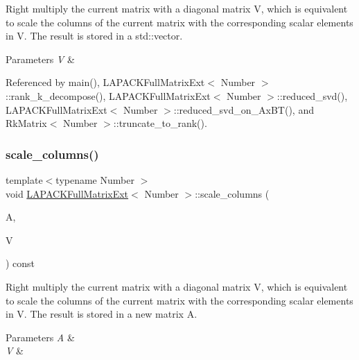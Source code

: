 Right multiply the current matrix with a diagonal matrix {\ttfamily V}, which is equivalent to scale the columns of the current matrix with the corresponding scalar elements in {\ttfamily V}. The result is stored in a {\ttfamily std\+::vector}.


\begin{DoxyParams}{Parameters}
{\em V} & \\
\hline
\end{DoxyParams}


Referenced by main(), L\+A\+P\+A\+C\+K\+Full\+Matrix\+Ext$<$ Number $>$\+::rank\+\_\+k\+\_\+decompose(), L\+A\+P\+A\+C\+K\+Full\+Matrix\+Ext$<$ Number $>$\+::reduced\+\_\+svd(), L\+A\+P\+A\+C\+K\+Full\+Matrix\+Ext$<$ Number $>$\+::reduced\+\_\+svd\+\_\+on\+\_\+\+Ax\+B\+T(), and Rk\+Matrix$<$ Number $>$\+::truncate\+\_\+to\+\_\+rank().

\mbox{\label{classLAPACKFullMatrixExt_a2510d3bd30956bb2831b960796d3abca}} 
\subsubsection{\texorpdfstring{scale\+\_\+columns()}{scale\_columns()}\hspace{0.1cm}{\footnotesize\ttfamily [2/3]}}
{\footnotesize\ttfamily template$<$typename Number $>$ \\
void \hyperlink{classLAPACKFullMatrixExt}{L\+A\+P\+A\+C\+K\+Full\+Matrix\+Ext}$<$ Number $>$\+::scale\+\_\+columns (\begin{DoxyParamCaption}\item[{\hyperlink{classLAPACKFullMatrixExt}{L\+A\+P\+A\+C\+K\+Full\+Matrix\+Ext}$<$ Number $>$ \&}]{A,  }\item[{const std\+::vector$<$ typename numbers\+::\+Number\+Traits$<$ Number $>$\+::real\+\_\+type $>$ \&}]{V }\end{DoxyParamCaption}) const}

Right multiply the current matrix with a diagonal matrix {\ttfamily V}, which is equivalent to scale the columns of the current matrix with the corresponding scalar elements in {\ttfamily V}. The result is stored in a new matrix {\ttfamily A}.


\begin{DoxyParams}{Parameters}
{\em A} & \\
\hline
{\em V} & \\
\hline
\end{DoxyParams}
\mbox{\label{classLAPACKFullMatrixExt_ab6e19be9ab53b4a38ba0d47a3b5f3daa}} 
